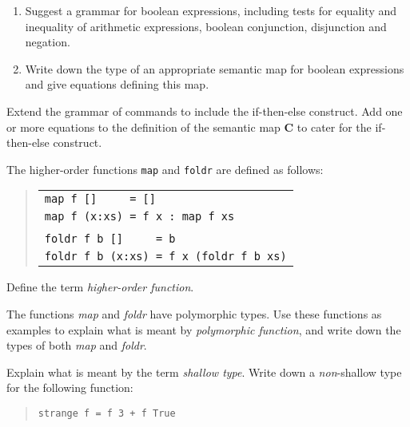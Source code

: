\begin{questions}
\begin{subquestions}
\begin{enumerate}
  \item Suggest a grammar for boolean expressions, including tests for
	equality and inequality of arithmetic expressions, boolean
	conjunction, disjunction and negation.

  \item	Write down the type of an appropriate semantic map for boolean
	expressions and give equations defining this map.
\end{enumerate}

		\subquestion

Extend the grammar of commands to include the if-then-else construct.
Add one or more equations to the definition of the semantic map {\bf C}
to cater for the if-then-else construct.

	\end{subquestions}

	\question

The higher-order functions \verb"map" and \verb"foldr" are defined as follows:
	\begin{quote}
	\begin{tabular}{l}
	 \verb"map f []     = []" \\
	 \verb"map f (x:xs) = f x : map f xs" \\
	 \\
	 \verb"foldr f b []     = b" \\
	 \verb"foldr f b (x:xs) = f x (foldr f b xs)"
	\end{tabular}
	\end{quote}

	\begin{subquestions}

		\subquestion 

Define the term {\em higher-order function}.

		\subquestion 

The functions {\it map} and {\it foldr} have polymorphic types. Use these
functions as examples to explain what is meant by {\em polymorphic function},
and write down the types of both {\it map} and {\it foldr}.

		\subquestion 

Explain what is meant by the term {\em shallow type}. Write down a
{\em non}-shallow type for the following function:
\begin{quote}
 \verb"strange f = f 3 + f True"
\end{quote}


\end{subquestions}
\end{questions}
